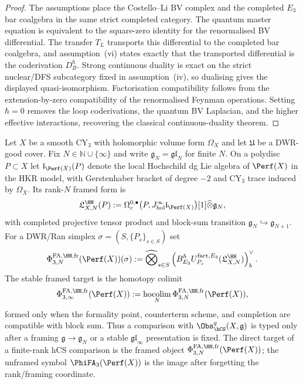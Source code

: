 \begin{proof}
The assumptions place the Costello--Li BV complex and the completed
$E_3$ bar coalgebra in the same strict completed category. The quantum
master equation is equivalent to the square-zero identity for the
renormalised BV differential. The transfer $T_L$ transports this
differential to the completed bar coalgebra, and assumption~(vi) states
exactly that the transported differential is the coderivation
$D_B^\hbar$. Strong continuous duality is exact on the strict
nuclear/DFS subcategory fixed in assumption~(iv), so dualising gives
the displayed quasi-isomorphism. Factorisation compatibility follows
from the extension-by-zero compatibility of the renormalised Feynman
operations. Setting $\hbar=0$ removes the loop coderivations, the
quantum BV Laplacian, and the higher effective interactions, recovering
the classical continuous-duality theorem.
\end{proof}

\begin{definition}
\label{def:framed-hcs-hochschild-target}
Let $X$ be a smooth CY$_3$ with holomorphic volume form $\Omega_X$ and
let $\mathfrak U$ be a DWR-good cover. Fix
$N\in \mathbb N\cup\{\infty\}$ and write
$\mathfrak g_N=\mathfrak{gl}_N$ for finite $N$. On a polydisc
$P\subset X$ let $\mathfrak l_{\Perf(X)}(P)$ denote the local
Hochschild dg Lie algebra of $\Perf(X)$ in the HKR model, with
Gerstenhaber bracket of degree $-2$ and CY$_3$ trace induced by
$\Omega_X$. Its rank-$N$ framed form is
\[
 \mathfrak L^{\HH}_{X,N}(P)
 :=
 \Omega^{0,\bullet}_c
 \bigl(P,J^\infty_{\mathrm{hol}}\mathfrak l_{\Perf(X)}\bigr)[1]
 \widehat\otimes \mathfrak g_N ,
\]
with completed projective tensor product and block-sum transition
$\mathfrak g_N\hookrightarrow\mathfrak g_{N+1}$. For a DWR/Ran simplex
$\sigma=(S,\{P_s\}_{s\in S})$ set
\[
 \Phi^{\mathrm{FA},\HH,\mathrm{fr}}_{3,N}(\Perf(X))(\sigma)
 :=
 \widehat{\bigotimes}_{s\in S}
 \left(
 B^\hbar_{E_3}
 U^{\mathrm{fact},E_3}_{P_s}
 (\mathfrak L^{\HH}_{X,N})
 \right)^\vee_b .
\]
The stable framed target is the homotopy colimit
\[
 \Phi^{\mathrm{FA},\HH,\mathrm{fr}}_{3,\infty}(\Perf(X))
 :=
 \operatorname*{hocolim}_{N}
 \Phi^{\mathrm{FA},\HH,\mathrm{fr}}_{3,N}(\Perf(X)),
\]
formed only when the formality point, counterterm scheme, and
completion are compatible with block sum. Thus a comparison with
$\Obs^q_{\hCS}(X,\mathfrak g)$ is typed only after a framing
$\mathfrak g\to\mathfrak g_N$ or a stable $\mathfrak{gl}_\infty$
presentation is fixed. The direct target of a finite-rank hCS
comparison is the framed object
$\Phi^{\mathrm{FA},\HH,\mathrm{fr}}_{3,N}(\Perf(X))$; the unframed symbol
$\PhiFA_3(\Perf(X))$ is the image after forgetting the rank/framing
coordinate.
\end{definition}

